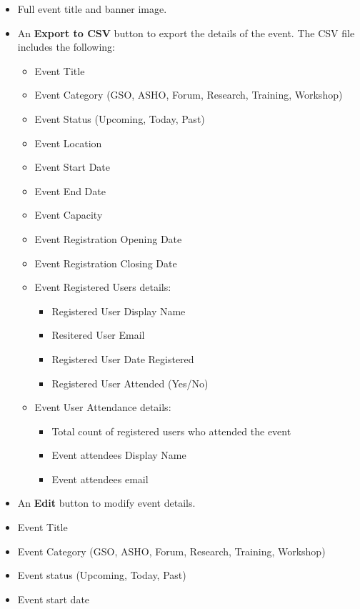 \documentclass[12pt, a4paper]{article}
\begin{document}
\begin{itemize}[leftmargin=1.5em]
  \item Full event title and banner image.
  \item An \textbf{Export to CSV} button to export the details of the event. The CSV file includes the following:
    \begin{itemize}[leftmargin=1.5em]
      \item Event Title
      \item Event Category (GSO, ASHO, Forum, Research, Training, Workshop)
      \item Event Status (Upcoming, Today, Past)
      \item Event Location
      \item Event Start Date
      \item Event End Date
      \item Event Capacity
      \item Event Registration Opening Date
      \item Event Registration Closing Date
      \item Event Registered Users details:
        \begin{itemize}
          \item Registered User Display Name 
          \item Resitered User Email
          \item Registered User Date Registered
          \item Registered User Attended (Yes/No)
        \end{itemize}
      \item Event User Attendance details:
        \begin{itemize}
          \item Total count of registered users who attended the event 
          \item Event attendees Display Name
          \item Event attendees email
        \end{itemize}
    \end{itemize}
  \item An \textbf{Edit} button to modify event details.
  \item Event Title
  \item Event Category (GSO, ASHO, Forum, Research, Training, Workshop)
  \item Event status (Upcoming, Today, Past)
  \item Event start date

\end{itemize}
\end{document}
